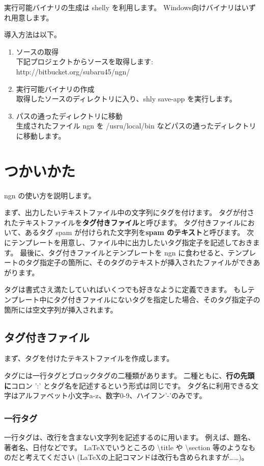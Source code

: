 \documentclass[a4j]{jsarticle}
\begin{document}
実行可能バイナリの生成は shelly を利用します。
Windows向けバイナリはいずれ用意します。

導入方法は以下。
\begin{enumerate}
  \item ソースの取得 \\
    下記プロジェクトからソースを取得します: \\
    http://bitbucket.org/subaru45/ngn/

  \item 実行可能バイナリの作成 \\
    取得したソースのディレクトリに入り、shly save-app を実行します。

  \item パスの通ったディレクトリに移動 \\
    生成されたファイル ngn を /usru/local/bin などパスの通ったディレクトリに移動します。
\end{enumerate}


\section{つかいかた}
ngn の使い方を説明します。

まず、出力したいテキストファイル中の文字列にタグを付けます。
タグが付されたテキストファイルを\textbf{タグ付きファイル}と呼びます。
タグ付きファイルにおいて、あるタグ spam が付けられた文字列を\textbf{spam のテキスト}と呼びます。
次にテンプレートを用意し、ファイル中に出力したいタグ指定子を記述しておきます。
最後に、タグ付きファイルとテンプレートを ngn に食わせると、テンプレートのタグ指定子の箇所に、そのタグのテキストが挿入されたファイルができあがります。

タグは書式さえ満たしていればいくつでも好きなように定義できます。
もしテンプレート中にタグ付きファイルにないタグを指定した場合、そのタグ指定子の箇所には空文字列が挿入されます。


\subsection{タグ付きファイル}
まず、タグを付けたテキストファイルを作成します。


タグには一行タグとブロックタグの二種類があります。
二種ともに、\textbf{行の先頭に}コロン ':' とタグ名を記述するという形式は同じです。
タグ名に利用できる文字はアルファベット小文字a-z、数字0-9、ハイフン'-'のみです。


\subsubsection{一行タグ}
一行タグは、改行を含まない文字列を記述するのに用います。
例えば、題名、著者名、日付などです。
\LaTeX でいうところの \textbackslash title や \textbackslash section 等のようなものだと考えてください (\LaTeX の上記コマンドは改行も含められますが……)。
\end{document}
